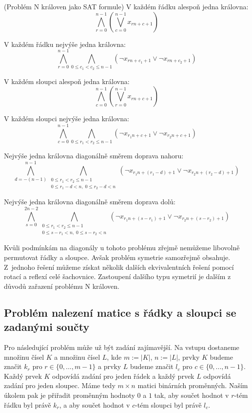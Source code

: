 \begin{pozn}{(Problém N královen jako SAT formule)}
V každém řádku alespoň jedna královna: \[
\bigwedge_{r=0}^{n-1}
\left(
\bigvee_{c=0}^{n-1}
x_{rn+c+1}
\right)
\]

V každém řádku nejvýše jedna královna: \[
\bigwedge_{r=0}^{n-1}
\bigwedge_{0 \le c_1 < c_2 \le n-1}
\left(
\neg x_{rn+c_1+1} \vee
\neg x_{rn+c_2+1}
\right)
\]

V každém sloupci alespoň jedna královna: \[
\bigwedge_{c=0}^{n-1}
\left(
\bigvee_{r=0}^{n-1}
x_{rn+c+1}
\right)
\]

V každém sloupci nejvýše jedna královna: \[
\bigwedge_{c=0}^{n-1}
\bigwedge_{0 \le r_1 < r_2 \le n-1}
\left(
\neg x_{r_1 n+c+1} \vee
\neg x_{r_2 n+c+1}
\right)
\]

Nejvýše jedna královna diagonálně směrem doprava nahoru:
\[
\bigwedge_{d=-(n-1)}^{n-1}
\bigwedge_{\substack{
0 \le r_1 < r_2 \le n-1 \\
0 \le r_1-d < n,\; 0 \le r_2-d < n
}}
\left(
\neg x_{r_1 n+(r_1-d)+1} \vee
\neg x_{r_2 n+(r_2-d)+1}
\right)
\]

Nejvýše jedna královna diagonálně směrem doprava dolů:
\[
\bigwedge_{s=0}^{2n-2}
\bigwedge_{\substack{
0 \le r_1 < r_2 \le n-1 \\
0 \le s-r_1 < n,\; 0 \le s-r_2 < n
}}
\left(
\neg x_{r_1 n+(s-r_1)+1} \vee
\neg x_{r_2 n+(s-r_2)+1}
\right)
\]
\end{pozn}

Kvůli podmínkám na diagonály u tohoto problému zřejmě nemůžeme libovolně permutovat řádky a sloupce. Avšak problém symetrie samozřejmě obsahuje. Z jednoho řešení můžeme získat několik dalších ekvivalentních řešení pomocí rotací a reflexí celé šachovnice. Zastoupení dalšího typu symetrií je dalším z důvodů zařazení problému N královen.

\subsection{Problém nalezení matice s řádky a sloupci se zadanými součty}
Pro následující problém může už být zadání zajímavější. Na vstupu dostaneme množinu čísel $K$ a množinu čísel $L$, kde $m:=|K|$, $n:=|L|$, prvky $K$ budeme značit $k_r$ pro $r\in \{0,...,m-1\}$ a prvky $L$ budeme značit $l_c$ pro $c\in \{0,...,n-1\}$. Každý prvek $K$ odpovídá zadání pro jeden řádek a každý prvek $L$ odpovídá zadání pro jeden sloupec. Máme tedy $m\times n$ matici binárních proměnných. Naším úkolem pak je přiřadit proměnným hodnoty $0$ a $1$ tak, aby součet hodnot v $r$-tém řádku byl právě $k_r$, a aby součet hodnot v $c$-tém sloupci byl právě $l_c$.

